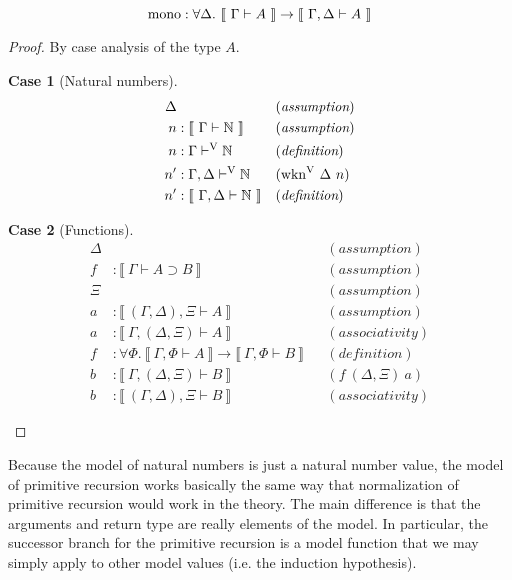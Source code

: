 \documentclass{llncs}
\newtheorem{scase}{Case}
\def\arr{\supset}
\def\marr{\rightarrow}
\def\nat{\mathbb{N}}
\def\mono{\fun{mono}}
\def\bydef{(\textit{definition})}
\def\byass{(\textit{assumption})}
\newcommand{\by}[1]{(#1)}
\newcommand{\turn}[1]{\vdash^\con{#1}}
\newcommand{\all}[1]{\forall#1.~}
\newcommand{\el}[1]{\llbracket ~ #1 ~ \rrbracket}
\newcommand{\wknv}[1]{\fun{wkn}^\con{V} ~ \Delta ~ #1}
\newcommand{\con}[1]{\textmd{#1}}
\newcommand{\fun}[1]{\textmd{#1}}
\newcommand{\typm}[1]{\el{\Gamma \vdash #1}}
\newcommand{\gdtypm}[1]{\el{\Gamma, \Delta \vdash #1}}
\newcommand{\gftypm}[1]{\el{\Gamma, \Phi \vdash #1}}
\newcommand{\typv}[1]{\Gamma \turn{V} #1}
\newcommand{\gdtypv}[1]{\Gamma, \Delta \turn{V} #1}
\begin{document}
\begin{lemma}
\label{lem:mod:mono}
$$
\mono : \all{\Delta} \typm{A} \marr \gdtypm{A}
$$

\begin{proof}

By case analysis of the type $A$.

\begin{scase}[Natural numbers]
\begin{align*}
\Delta& && \byass\\
n  &: \typm{\nat} && \byass\\
n  &: \typv{\nat} && \bydef\\
n' &: \gdtypv{\nat} && \by{\wknv{n}}\\
n' &: \gdtypm{\nat} && \bydef
\end{align*}
\end{scase}

\begin{scase}[Functions]
\begin{align*}
\Delta& && \byass\\
f  &: \typm{A \arr B} && \byass\\
\Xi& && \byass\\
a  &: \el{(\Gamma, \Delta), \Xi \vdash A} && \byass\\
a  &: \el{\Gamma, (\Delta, \Xi) \vdash A} && \by{associativity}\\
f  &: \all{\Phi} \gftypm{A} \marr \gftypm{B} && \bydef\\
b  &: \el{\Gamma, (\Delta, \Xi) \vdash B} && \by{f~(\Delta,\Xi)~a}\\
b  &: \el{(\Gamma, \Delta), \Xi \vdash B} && \by{associativity}
\end{align*}
\end{scase}

\end{proof}

\end{lemma}

Because the model of natural numbers is just a natural number value,
the model of primitive recursion works basically the same way that
normalization of primitive recursion would work in the theory. The
main difference is that the arguments and return type are really
elements of the model. In particular, the successor branch for the
primitive recursion is a model function that we may simply apply to
other model values (i.e. the induction hypothesis).
\end{document}
